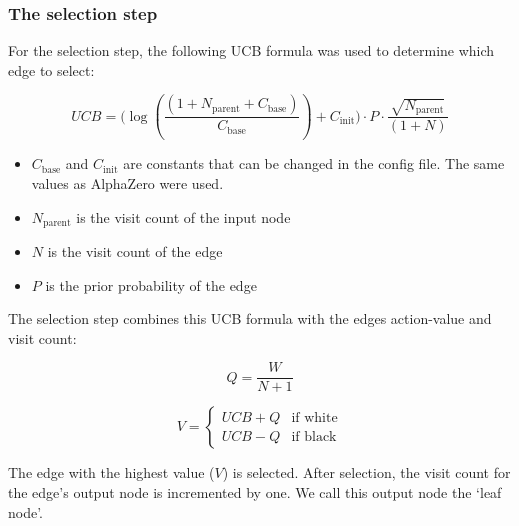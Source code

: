 \documentclass{article}
\begin{document}
\subsubsection{The selection step}

For the selection step, the following UCB formula \cite{silverMasteringChessShogi2017a} was used to determine which edge to select:

\begin{center}
    \begin{equation}
        UCB = \Big(\log({\frac{(1 + N_{\text{parent}} + C_{\text{base}})}{C_{\text{base}}}}) + C_{\text{init}}\Big) \cdot P \cdot \frac{\sqrt{N_\text{parent}}}{(1 + N)}
    \end{equation}
\end{center}

\begin{itemize} 
    \item $C_{\text{base}}$ and $C_{\text{init}}$ are constants that can be changed in the config file. The same values as AlphaZero were used.
    \item $N_{\text{parent}}$ is the visit count of the input node
    \item $N$ is the visit count of the edge
    \item $P$ is the prior probability of the edge
\end{itemize}

The selection step combines this UCB formula with the edges action-value and visit count:

\begin{center}
    \begin{equation}
        Q = \frac{W}{N+1}
    \end{equation}
\end{center}

\begin{center}
    \begin{equation}
        V = 
        \begin{cases}
            UCB + Q & \text{if white} \\
            UCB - Q & \text{if black}
        \end{cases}
    \end{equation}
\end{center}

The edge with the highest value ($V$) is selected. After selection, the 
visit count for the edge's output node is incremented by one. 
We call this output node the `leaf node'. 
\end{document}
